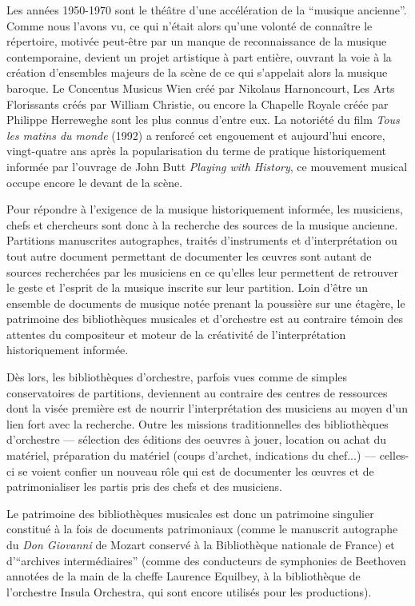 \bigskip Les années 1950-1970 sont le théâtre d’une accélération de la \enquote{musique ancienne}. Comme nous l’avons vu, ce qui n’était alors qu’une volonté de connaître le répertoire, motivée peut-être par un manque de reconnaissance de la musique contemporaine, devient un projet artistique à part entière, ouvrant la voie à la création d’ensembles majeurs de la scène de ce qui s’appelait alors la musique baroque. Le Concentus Musicus Wien créé par Nikolaus Harnoncourt, Les Arts Florissants créés par William Christie, ou encore la Chapelle Royale créée par Philippe Herreweghe sont les plus connus d'entre eux. La notoriété du film \textit{Tous les matins du monde} (1992) a renforcé cet engouement et aujourd’hui encore, vingt-quatre ans après la popularisation du terme de pratique historiquement informée par l’ouvrage de John Butt \textit{Playing with History}, ce mouvement musical occupe encore le devant de la scène.

\bigskip Pour répondre à l’exigence de la musique historiquement informée, les musiciens, chefs et chercheurs sont donc à la recherche des sources de la musique ancienne. Partitions manuscrites autographes, traités d'instruments et d'interprétation ou tout autre document permettant de documenter les œuvres sont autant de sources recherchées par les musiciens en ce qu'elles leur permettent de retrouver le geste et l'esprit de la musique inscrite sur leur partition. Loin d'être un ensemble de documents de musique notée prenant la poussière sur une étagère, le patrimoine des bibliothèques musicales et d’orchestre est au contraire témoin des attentes du compositeur et moteur de la créativité de l'interprétation historiquement informée.

\smallskip\indent Dès lors, les bibliothèques d'orchestre, parfois vues comme de simples conservatoires de partitions, deviennent au contraire des centres de ressources dont la visée première est de nourrir l'interprétation des musiciens au moyen d’un lien fort avec la recherche. Outre les missions traditionnelles des bibliothèques d'orchestre --- sélection des éditions des oeuvres à jouer, location ou achat du matériel, préparation du matériel (coups d'archet, indications du chef...) --- celles-ci se voient confier un nouveau rôle qui est de documenter les œuvres et de patrimonialiser les partis pris des chefs et des musiciens.

\bigskip Le patrimoine des bibliothèques musicales est donc un patrimoine singulier constitué à la fois de documents patrimoniaux (comme le manuscrit autographe du \textit{Don Giovanni} de Mozart conservé à la Bibliothèque nationale de France) et d'\enquote{archives intermédiaires} (comme des conducteurs de symphonies de Beethoven annotées de la main de la cheffe Laurence Equilbey, à la bibliothèque de l’orchestre Insula Orchestra, qui sont encore utilisés pour les productions).

